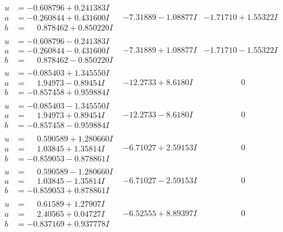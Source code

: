 \documentclass[1p]{elsarticle_modified}
\theoremstyle{definition}
\begin{document}
$$\begin{array}{c|c|c}
\begin{aligned}
u &= -0.608796 + 0.241383 I \\
a &= -0.260844 + 0.431600 I \\
b &= \phantom{-}0.878462 + 0.850220 I\end{aligned}
 & -7.31889 - 1.08877 I & -1.71710 + 1.55322 I \\ \hline\begin{aligned}
u &= -0.608796 - 0.241383 I \\
a &= -0.260844 - 0.431600 I \\
b &= \phantom{-}0.878462 - 0.850220 I\end{aligned}
 & -7.31889 + 1.08877 I & -1.71710 - 1.55322 I \\ \hline\begin{aligned}
u &= -0.085403 + 1.345550 I \\
a &= \phantom{-}1.94973 - 0.89454 I \\
b &= -0.857458 + 0.959884 I\end{aligned}
 & -12.2733 + 8.6180 I & \phantom{-0.000000 } 0 \\ \hline\begin{aligned}
u &= -0.085403 - 1.345550 I \\
a &= \phantom{-}1.94973 + 0.89454 I \\
b &= -0.857458 - 0.959884 I\end{aligned}
 & -12.2733 - 8.6180 I & \phantom{-0.000000 } 0 \\ \hline\begin{aligned}
u &= \phantom{-}0.590589 + 1.280660 I \\
a &= \phantom{-}1.03845 + 1.35814 I \\
b &= -0.859053 - 0.878861 I\end{aligned}
 & -6.71027 + 2.59153 I & \phantom{-0.000000 } 0 \\ \hline\begin{aligned}
u &= \phantom{-}0.590589 - 1.280660 I \\
a &= \phantom{-}1.03845 - 1.35814 I \\
b &= -0.859053 + 0.878861 I\end{aligned}
 & -6.71027 - 2.59153 I & \phantom{-0.000000 } 0 \\ \hline\begin{aligned}
u &= \phantom{-}0.61589 + 1.27907 I \\
a &= \phantom{-}2.40565 + 0.04727 I \\
b &= -0.837169 + 0.937778 I\end{aligned}
 & -6.52555 + 8.89397 I & \phantom{-0.000000 } 0 \\ \hline\begin{aligned}

\end{aligned}
\end{array}$$
\end{document}
